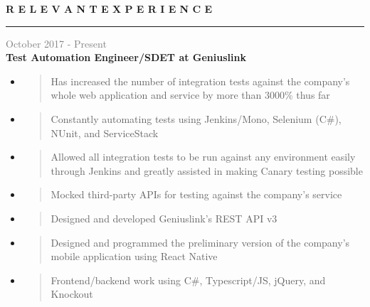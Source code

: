 \documentclass[letterpage]{article}
\begin{document}
\begin{minipage}[t]{0.63\linewidth}
\vspace{0pt}
\textbf{\fontsize{14px}{1px}\selectfont R E L E V A N T \:\:
E X P E R I E N C E}\\
\noindent\rule{4.295in}{0.1pt}

\vspace{7px}
\textcolor{gray}{October 2017 - Present}\\
\textbf{\textsf{Test Automation Engineer/SDET at Geniuslink}}
\begin{itemize}[leftmargin=*,labelindent=1mm,labelsep=0mm]
\renewcommand\labelitemi{\rule[1mm]{0.33mm}{0.33mm}}
\renewcommand\labelitemii{$\blacksquare$}
\item
  \begin{quote}
  \raggedright
  Has increased the number of integration tests against the company's whole web
  application and service by more than 3000\% thus far
  \end{quote}
\item
  \begin{quote}
  \raggedright
  Constantly automating tests using Jenkins/Mono,
  Selenium (C\#), NUnit, and ServiceStack
  \end{quote}
\item
  \begin{quote}
  \raggedright
  Allowed all integration tests to be run against any
  environment easily through Jenkins and greatly
  assisted in making Canary testing possible
  \end{quote}
\item
  \begin{quote}
  \raggedright
  Mocked third-party APIs for testing against the company's service
  \end{quote}
\item
  \begin{quote}
  \raggedright
  Designed and developed Geniuslink's REST API v3
  \end{quote}
\item
  \begin{quote}
  \raggedright
  Designed and programmed the preliminary version of the company's mobile
  application using React Native
  \end{quote}
\item
  \begin{quote}
  \raggedright
  Frontend/backend work using C\#, Typescript/JS,
  jQuery, and Knockout
  \end{quote}
\end{itemize}


\end{minipage}
\end{document}
